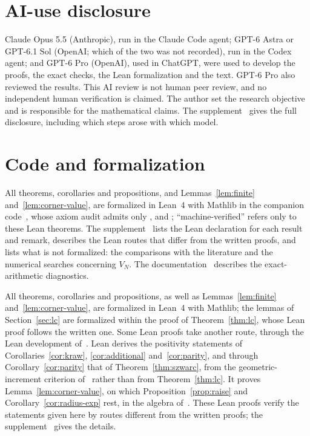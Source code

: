 \section*{AI-use disclosure}

Claude Opus 5.5 (Anthropic), run in the Claude Code agent; GPT-6 Astra or GPT-6.1 Sol (OpenAI; which of the two was not recorded), run in the Codex agent; and GPT-6 Pro (OpenAI), used in ChatGPT, were used to develop the proofs, the exact checks, the Lean formalization and the text. GPT-6 Pro also reviewed the results. This AI review is not human peer review, and no independent human verification is claimed. The author set the research objective and is responsible for the mathematical claims. The supplement~\cite{supp} gives the full disclosure, including which steps arose with which model.

\section*{Code and formalization}

All theorems, corollaries and propositions, and Lemmas~\ref{lem:finite} and~\ref{lem:corner-value}, are formalized in Lean~4 with Mathlib in the companion code~\cite{code}, whose axiom audit admits only ,  and ; ``machine-verified'' refers only to these Lean theorems. The supplement~\cite{supp} lists the Lean declaration for each result and remark, describes the Lean routes that differ from the written proofs, and lists what is not formalized: the comparisons with the literature and the numerical searches concerning $V_N$. The documentation~\cite{docs} describes the exact-arithmetic diagnostics.

All theorems, corollaries and propositions, as well as Lemmas~\ref{lem:finite} and~\ref{lem:corner-value}, are formalized in Lean~4 with Mathlib; the lemmas of Section~\ref{sec:lc} are formalized within the proof of Theorem~\ref{thm:lc}, whose Lean proof follows the written one. Some Lean proofs take another route, through the Lean development of~\cite{P3}. Lean derives the positivity statements of Corollaries~\ref{cor:kraw}, \ref{cor:additional} and~\ref{cor:parity}, and through Corollary~\ref{cor:parity} that of Theorem~\ref{thm:szwarc}, from the geometric-increment criterion of~\cite{P3} rather than from Theorem~\ref{thm:lc}. It proves Lemma~\ref{lem:corner-value}, on which Proposition~\ref{prop:raise} and Corollary~\ref{cor:radius-exp} rest, in the algebra of~\cite{P3}. These Lean proofs verify the statements given here by routes different from the written proofs; the supplement~\cite{supp} gives the details.

